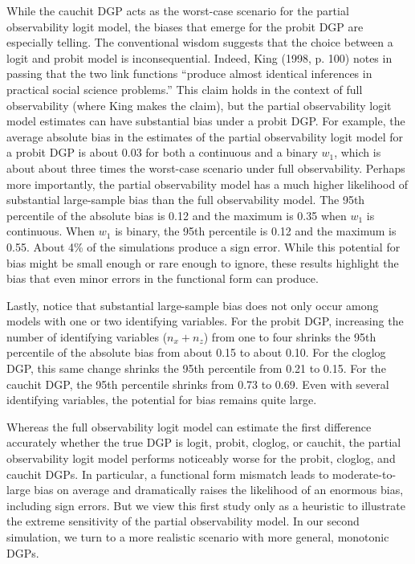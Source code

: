 \documentclass[10pt]{article}
\begin{document}
While the cauchit DGP acts as the worst-case scenario for the partial observability logit model, the biases that emerge for the probit DGP are especially telling. 
The conventional wisdom suggests that the choice between a logit and probit model is inconsequential. 
Indeed, King (1998, p. 100) notes in passing that the two link functions ``produce almost identical inferences in practical social science problems.'' 
This claim holds in the context of full observability (where King makes the claim), but the partial observability logit model estimates can have substantial bias under a probit DGP. 
For example, the average absolute bias in the estimates of the partial observability logit model for a probit DGP is about 0.03 for both a continuous and a binary $w_1$, which is about about three times the worst-case scenario under full observability.  
Perhaps more importantly, the partial observability model has a much higher likelihood of substantial large-sample bias than the full observability model. 
The 95th percentile of the absolute bias is 0.12 and the maximum is 0.35 when $w_1$ is continuous. When $w_1$ is binary, the 95th percentile is 0.12 and the maximum is 0.55.
About 4\% of the simulations produce a sign error. 
While this potential for bias might be small enough or rare enough to ignore, these results highlight the bias that even minor errors in the functional form can produce.

Lastly, notice that substantial large-sample bias does not only occur among models with one or two identifying variables. 
For the probit DGP, increasing the number of identifying variables ($n_x + n_z$) from one to four shrinks the 95th percentile of the absolute bias from about 0.15 to about 0.10. 
For the cloglog DGP, this same change shrinks the 95th percentile from 0.21 to 0.15. 
For the cauchit DGP, the 95th percentile shrinks from 0.73 to 0.69. 
Even with several identifying variables, the potential for bias remains quite large.
 
Whereas the full observability logit model can estimate the first difference accurately whether the true DGP is logit, probit, cloglog, or cauchit, the partial observability logit model performs noticeably worse for the probit, cloglog, and cauchit DGPs. 
In particular, a functional form mismatch leads to moderate-to-large bias on average and dramatically raises the likelihood of an enormous bias, including sign errors. 
But we view this first study only as a heuristic to illustrate the extreme sensitivity of the partial observability model. 
In our second simulation, we turn to a more realistic scenario with more general, monotonic DGPs.
\end{document}

